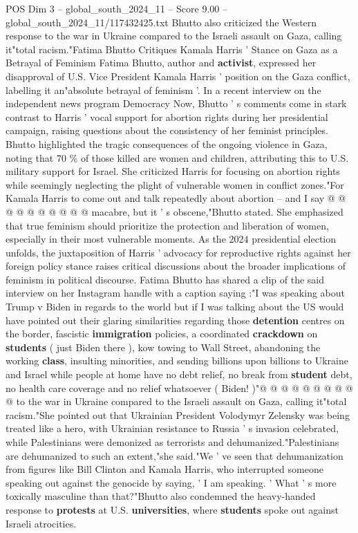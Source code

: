 \begin{textsample}{POS Dim 3 – global\_south\_2024\_11 – Score 9.00 – global\_south\_2024\_11/117432425.txt}  \label{ex:f3_pos_304}
Bhutto also criticized the Western response to the war in Ukraine compared to the Israeli assault on Gaza, calling it"total racism."Fatima Bhutto Critiques Kamala Harris ' Stance on Gaza as a Betrayal of Feminism Fatima Bhutto, author and \textbf{activist}, expressed her disapproval of U.S.
Vice President Kamala Harris ' position on the Gaza conflict, labelling it an"absolute betrayal of feminism '.
In a recent interview on the independent news program Democracy Now, Bhutto ' s comments come in stark contrast to Harris ' vocal support for abortion rights during her presidential campaign, raising questions about the consistency of her feminist principles.
Bhutto highlighted the tragic consequences of the ongoing violence in Gaza, noting that 70 \% of those killed are women and children, attributing this to U.S. military support for Israel.
She criticized Harris for focusing on abortion rights while seemingly neglecting the plight of vulnerable women in conflict zones."For Kamala Harris to come out and talk repeatedly about abortion -- and I say @ @ @ @ @ @ @ @ @ @ macabre, but it ' s obscene,"Bhutto stated.
She emphasized that true feminism should prioritize the protection and liberation of women, especially in their most vulnerable moments.
As the 2024 presidential election unfolds, the juxtaposition of Harris ' advocacy for reproductive rights against her foreign policy stance raises critical discussions about the broader implications of feminism in political discourse.
Fatima Bhutto has shared a clip of the said interview on her Instagram handle with a caption saying :"I was speaking about Trump v Biden in regards to the world but if I was talking about the US would have pointed out their glaring similarities regarding those \textbf{detention} centres on the border, fascistic \textbf{immigration} policies, a coordinated \textbf{crackdown} on \textbf{students} ( just Biden there ), kow towing to Wall Street, abandoning the working \textbf{class}, insulting minorities, and sending billions upon billions to Ukraine and Israel while people at home have no debt relief, no break from \textbf{student} debt, no health care coverage and no relief whatsoever ( Biden! )"@ @ @ @ @ @ @ @ @ @ to the war in Ukraine compared to the Israeli assault on Gaza, calling it"total racism."She pointed out that Ukrainian President Volodymyr Zelensky was being treated like a hero, with Ukrainian resistance to Russia ' s invasion celebrated, while Palestinians were demonized as terrorists and dehumanized."Palestinians are dehumanized to such an extent,"she said."We ' ve seen that dehumanization from figures like Bill Clinton and Kamala Harris, who interrupted someone speaking out against the genocide by saying, ' I am speaking. ' What ' s more toxically masculine than that?"Bhutto also condemned the heavy-handed response to \textbf{protests} at U.S. \textbf{universities}, where \textbf{students} spoke out against Israeli atrocities.

\end{textsample}
